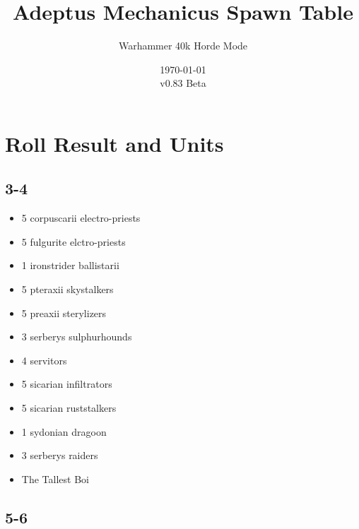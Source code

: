 \documentclass{HordeModeTarot}
\title{Adeptus Mechanicus Spawn Table}
\author{Warhammer 40k Horde Mode}
\date{\today \\v0.83 Beta}
\begin{document}
\maketitle

\outputUsingSpawnTableBoilerplate
\section{Roll Result and Units}\hypertarget{roll-results}{}\label{roll-results}

\begin{multicols}{2}

\subsection*{3-4}

\begin{itemize}[leftmargin=*]
\item[] 5 corpuscarii electro-priests
\item[] 5 fulgurite elctro-priests
\item[] 1 ironstrider ballistarii
\item[] 5 pteraxii skystalkers
\item[] 5 preaxii sterylizers
\item[] 3 serberys sulphurhounds
\item[] 4 servitors
\item[] 5 sicarian infiltrators
\item[] 5 sicarian ruststalkers
\item[] 1 sydonian dragoon
\item[] 3 serberys raiders
\item[] The Tallest Boi
\end{itemize}

\subsection*{5-6}


\end{multicols}
\end{document}
